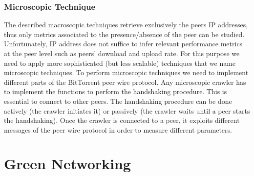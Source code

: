 \subsubsection{Microscopic Technique}
The described macroscopic techniques retrieve exclusively the peers IP addresses, thus only metrics associated to the presence/absence of the peer can be studied. Unfortunately, IP address does not suffice to infer relevant performance metrics at the peer level such as peers’ download and upload rate. 
For this purpose we need to apply more sophisticated (but less scalable) techniques that we name microscopic techniques.
To perform microscopic techniques we need to implement different parts of the BitTorrent peer wire protocol. 
Any microscopic crawler has to implement the functions to perform the handshaking procedure. 
This is essential to connect to other peers. 
The handshaking procedure can be done actively (the crawler initiates it) or passively (the crawler waits until a peer starts the handshaking). 
Once the crawler is connected to a peer, it exploits different messages of the peer wire protocol in order to measure different parameters. 


\section{Green Networking}

